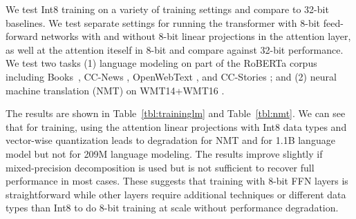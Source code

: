 \documentclass{article}
\begin{document}
We test Int8 training on a variety of training settings and compare to 32-bit baselines. We test separate settings for running the transformer with 8-bit feed-forward networks with and without 8-bit linear projections in the attention layer, as well at the attention iteself in 8-bit and compare against 32-bit performance. 
We test two tasks (1) language modeling on part of the RoBERTa corpus including Books~\citep{zhu2015aligning}, CC-News \citep{nagel2016cc}, OpenWebText \citep{gokaslan2019openwebtext}, and CC-Stories \citep{trinh2018simple}; and (2) neural machine translation (NMT) \citep{ott2018scaling} on WMT14+WMT16 \citep{machavcek2014results, sennrich2016edinburgh}. 

The results are shown in Table~\ref{tbl:traininglm} and Table~\ref{tbl:nmt}. We can see that for training, using the attention linear projections with Int8 data types and vector-wise quantization leads to degradation for NMT and for 1.1B language model but not for 209M language modeling. The results improve slightly if mixed-precision decomposition is used but is not sufficient to recover full performance in most cases. 
These suggests that training with 8-bit FFN layers is straightforward while other layers require additional techniques or different data types than Int8 to do 8-bit training at scale without performance degradation.
\end{document}
